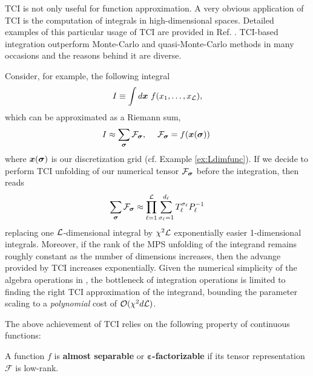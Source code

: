 TCI is not only useful for function approximation. A very obvious application of TCI is the computation of integrals in high-dimensional spaces. Detailed examples of this particular usage of TCI are provided in Ref. \cite{Fernandez2022, Fernandez2024, Dolgov2020}. TCI-based integration outperform Monte-Carlo and quasi-Monte-Carlo methods in many occasions and the reasons behind it are diverse. 

Consider, for example, the following integral
\begin{equation}
	I \equiv \int d\boldsymbol{x} \ f(x_1,\dots,x_\mL),
	\label{eq:LdimIntegral}
\end{equation}
which can be approximated as a Riemann sum,
\begin{equation}
	I \approx \sum_{\boldsymbol{\sigma}} \mathcal{F}_{\boldsymbol{\sigma}}  ,\quad \; \mathcal{F}_{\boldsymbol{\sigma}} = f(\boldsymbol{x}(\boldsymbol{\sigma}))\;
	\label{eq:LdimapproxIntegral}
\end{equation}
where $\boldsymbol{x}(\boldsymbol{\sigma})$ is our discretization grid (cf. Example \ref{ex:Ldimfunc}). If we decide to perform TCI unfolding of our numerical tensor $\mathcal{F}_{\boldsymbol{\sigma}}$ before the integration,  then reads\footnotemark
\begin{equation}
	\sum_{\boldsymbol{\sigma}} \mathcal{F}_{\boldsymbol{\sigma}} \approx \prod_{\ell=1}^{\mathcal{L}} \sum^{d_\ell}_{\sigma_\ell = 1} T^{\sigma_\ell}_\ell P^{-1}_\ell
	\label{eq:LdimTCIIntegral}
\end{equation}
replacing one $\mathcal{L}$-dimensional integral by $\chi^2\mathcal{L}$ exponentially easier 1-dimensional integrals. Moreover, if the rank of the MPS unfolding of the integrand remains roughly constant as the number of dimensions increases, then the advange provided by TCI increases exponentially. Given the numerical simplicity of the algebra operations in , the bottleneck of integration operations is limited to finding the right TCI approximation of the integrand, bounding the parameter scaling to a \textit{polynomial} cost of $\mathcal{O} (\chi^2d\mathcal{L})$. 


The above achievement of TCI relies on the following property of continuous functions:
\begin{definition}
	A function $f$ is {\normalfont \textbf{almost separable}} \cite{Fernandez2024} or {\normalfont \textbf{$\boldsymbol{\varepsilon}$-factorizable}} \cite{Fernandez2022} if its tensor representation $\mathcal{F}$ is low-rank.
	\label{def:separfunc}
\end{definition}

